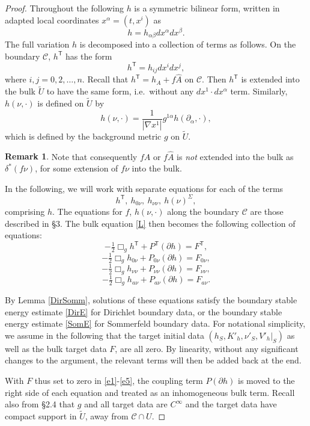 \documentclass[10pt]{amsart}
\renewcommand{\a}{\alpha}
\renewcommand{\b}{\beta}
\renewcommand{\d}{\delta}
\newcommand{\Si}{\Sigma}
\newcommand{\cC}{{\mathcal C}}
\newcommand{\tT}{\mathsf{T}}
\newcommand{\be}{\begin{equation}}
\newcommand{\ee}{\end{equation}}
\newcommand{\p}{\partial}
\renewcommand{\hat}{\widehat}
\newcommand{\<}{\langle}
\renewcommand{\>}{\rangle}
\newcommand{\w}{\widetilde}
\theoremstyle{plain}
\theoremstyle{remark}
\theoremstyle{definition}
\newtheorem{remark}[lemma]{Remark}
\numberwithin{equation}{section}
\begin{document}
 \begin{proof} 
 
 
  Throughout the following $h$ is a symmetric bilinear form, written in adapted local coordinates $x^{\a} = (t, x^i)$ as 
$$h = h_{\a\b}dx^{\a}dx^{\b}.$$
The full variation $h$ is decomposed into a collection of terms as follows. On the boundary $\cC$, $h^{\tT}$ has the form 
$$h^{\tT} = h_{ij}dx^i dx^j,$$
where $i, j = 0, 2, \dots, n$. Recall that $h^{\tT} = h_A + f\hat A$ on $\cC$. Then $h^{\tT}$ is extended into the bulk $\w U$ to have the same form, 
i.e.~without any $dx^1\cdot dx^{\a}$ term. Similarly, $h(\nu, \cdot)$ is defined on $\w U$ by 
\be \label{hnudef}
h(\nu, \cdot) = \frac{1}{|\nabla x^1|}g^{1 \a}h(\p_{\a}, \cdot),
\ee
which is defined by the background metric $g$ on $\w U$. 

\begin{remark} \label{fAext} 
{\rm 
Note that consequently $fA$ or $f\hat A$ is {\it not} extended into the bulk as $\d^*(f\nu)$, for some extension of $f\nu$ into the bulk. 
}
\end{remark}

    In the following, we will work with separate equations for each of the terms 
\be \label{comp}
h^{\tT}, \ h_{0\nu}, \ h_{\nu \nu}, \ h(\nu)^{\Si},
\ee
comprising $h$. The equations for $f$, $h(\nu, \cdot)$ along the boundary $\cC$ are those described in \S 3. 
The bulk equation \eqref{L} then becomes the following collection of equations: 
\be \label{e1}
-\tfrac{1}{2}\Box_g h^{\tT}  + P^{\tT}(\p h) = F^{\tT},
\ee
\be \label{e3}
-\tfrac{1}{2}\Box_g h_{0\nu}  + P_{0\nu}(\p h) = F_{0\nu},
\ee
\be \label{e4}
-\tfrac{1}{2}\Box_g h_{\nu \nu}  + P_{\nu \nu}(\p h) = F_{\nu \nu},
\ee
\be \label{e5}
-\tfrac{1}{2}\Box_g h_{a \nu} + P_{a\nu}(\p h) = F_{a\nu}.
\ee

  By Lemma \ref{DirSomm}, solutions of these equations satisfy the boundary stable energy estimate \eqref{DirE} for Dirichlet boundary data, or the 
boundary stable energy estimate \eqref{SomE} for Sommerfeld boundary data. For notational simplicity, we assume in the following that the target initial 
data $(h_S, K'_h, \nu'_S, V'_h|_S)$ as well as the bulk target data $F$, are all zero. By linearity, without any significant changes to the 
argument, the relevant terms will then be added back at the end. 

  With $F$ thus set to zero in \eqref{e1}-\eqref{e5}, the coupling term $P(\p h)$ is moved to the right side of each equation and 
treated as an inhomogeneous bulk term. Recall also from \S 2.4 that $g$ and all target data are $C^{\infty}$ and the target data 
have compact support in $\w U$, away from $\cC \cap U$. 
  

\end{proof}
\end{document}
